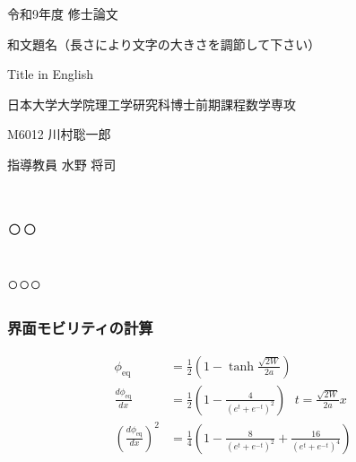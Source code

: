 \documentclass[12pt,uplatex,dvipdfmx,book,oneside]{jlreq}
\begin{document}

\begin{center}
{\Large
令和9年度 修士論文
}

\vspace{4cm}
{\Huge
和文題名（長さにより文字の大きさを調節して下さい）
}

\vspace{12pt}

{\huge
Title in English
}
\end{center}

\vfill
\begin{flushright}
\large
日本大学大学院理工学研究科博士前期課程数学専攻

M6012
川村聡一郎

指導教員 水野 将司
\end{flushright}

\thispagestyle{empty}

\newpage

\tableofcontents
\thispagestyle{empty}


\chapter{○○}





\section{○○○}

\subsection{界面モビリティの計算}
\begin{align}
    \phi_\mathrm{eq}
    &= \frac{1}{2}\left(1- \tanh{\frac{\sqrt{2W}}{2a}}\right)\\
    \frac{d\phi_\mathrm{eq}}{dx}
    &= \frac{1}{2}\left(1- \frac{4}{(e^t+ e^{-t})^2}\right)\ \ \ t= \frac{\sqrt{2W}}{2a}x\\
    \left(\frac{d\phi_\mathrm{eq}}{dx}\right)^2
    &= \frac{1}{4}\left(1- \frac{8}{(e^t+ e^{-t})^2}+ \frac{16}{(e^t+ e^{-t})^4}\right)
\end{align}
\end{document}
